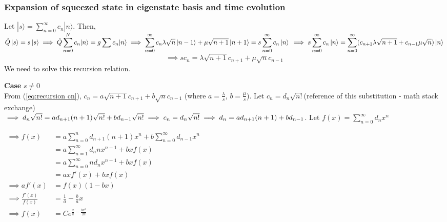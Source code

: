\documentclass[12pt, twoside]{article}
\begin{document}
\subsubsection{Expansion of squeezed state in eigenstate basis and time evolution}

Let $\displaystyle | s \rangle = \sum _ { n = 0 } ^ { \infty } c _ { n } | n \rangle$. Then, $\displaystyle\hat { Q } \ket{s} = s \ket{s} \implies \hat { Q } \sum _ { n = 0 } ^ { N } c _ { n } | n \rangle = g \sum c _ { n } | n \rangle \\ \implies \sum _ { n = 0 } ^ { \infty } c _ { n } \lambda \sqrt{n} \ket{n-1} + \mu \sqrt{n+1} \ket{n+1} =s \sum _ { n = 0 } ^ { \infty } c _ { n } \ket{n} \\ \implies s \sum _ { n = 0 } ^ { \infty } c _ { n } \ket{n} = \sum _ { n = 0 } ^ { \infty } (c _ { n+1 } \lambda \sqrt{n+1} +c _ { n-1 } \mu \sqrt{n}) \ket{n}$ \begin{equation}\label{eq:recursion cn}\implies s c_n =  \lambda \sqrt{n+1} c _ { n+1 } + \mu \sqrt{n} c _ { n-1 }\end{equation} 
We need to solve this recursion relation.

\textbf{Case} $s \neq 0$
\\From (\ref{eq:recursion cn}), $ c_n =  a \sqrt{n+1} c _ { n+1 } + b \sqrt{n} c _ { n-1 }$ (where $a = \frac{\lambda}{s}$, $b = \frac{\mu}{s}$). Let $c_n = d_n \sqrt{n!}$(reference of this substitution - math stack exchange) \\ $\implies d_n \sqrt{n!} = a d_{n+1} (n+1) \sqrt{n!} + b d_{n-1} \sqrt{n!} \\ \implies c_n = d_n \sqrt{n!} \\ \implies d_n = a d_{n+1} (n+1)  + b d_{n-1}$. Let $\displaystyle f ( x ) = \sum _ { n = 0 } ^ { \infty } d _ { n } x ^ { n }$

$ \begin{aligned} \implies f ( x ) &= a \sum _ { n = 0 } ^ { n } d _ { n + 1 } ( n + 1 ) x ^ { n } + b \sum _ { n = 0 } ^ { \infty } d _ { n - 1 } x ^ { n } \\ &= { a  \sum _ { n = 1 } ^ { \infty } d _ { n } n x ^ { n - 1 } } + { b x f( x ) } \\ &=  { a \sum _ { n = 0 } ^ { \infty } n d_n x ^ { n - 1 } } + {  b x f ( x ) } \\ &= a x f'(x) + b x f(x) \\\implies a f'(x)  &= f(x) (1-bx)\\ \implies \frac{f'(x)}{f(x)} &= \frac{1}{a} - \frac{b}{a} x \\ \implies f(x) &= C e^{\frac{x}{a} - \frac{bx^2}{2a}}\end{aligned}$
\end{document}

